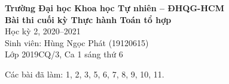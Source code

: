 \documentclass[12pt]{article}
\begin{document}
\begin{center}
    \large{\bfseries Trường Đại học Khoa học Tự nhiên -- ĐHQG-HCM}\\
    \LARGE{\bfseries Bài thi cuối kỳ Thực hành Toán tổ hợp} \\
    \Large{Học kỳ 2, 2020--2021}\\
    \large{Sinh viên: Hùng Ngọc Phát (19120615)}\\
    \large{Lớp 2019CQ/3, Ca 1 sáng thứ 6}\\[1.5cm]
\end{center}

Các bài đã làm: 1, 2, 3, 5, 6, 7, 8, 9, 10, 11.

\newpage
\newpage
\newpage
\newpage
\newpage
\newpage
\newpage
\newpage
\newpage

\renewcommand{\bibname}{Tài liệu tham khảo}


\end{document}
